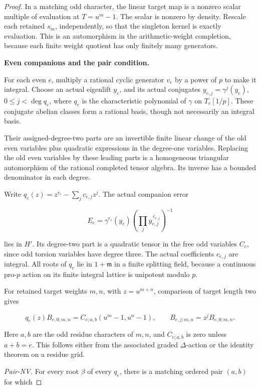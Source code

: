 \documentclass[11pt,a4paper]{article}
\theoremstyle{definition}
\begin{document}
\begin{proof}
In a matching odd character, the linear target map is a nonzero scalar multiple of evaluation at \(T=u^m-1\). The scalar is nonzero by density. Rescale each retained \(s_m\), independently, so that the singleton kernel is exactly evaluation. This is an automorphism in the arithmetic-weight completion, because each finite weight quotient has only finitely many generators.

\par\medskip\noindent\textbf{Even companions and the pair condition.}

For each even \(e\), multiply a rational cyclic generator \(v_e\) by a power of \(p\) to make it integral. Choose an actual eigenlift \(y_e\), and its actual conjugates \(y_{e,j}=\gamma^j(y_e)\), \(0\le j<\deg q_e\), where \(q_e\) is the characteristic polynomial of \(\gamma\) on \(T_e[1/p]\). These conjugate abelian classes form a rational basis, though not necessarily an integral basis.

Their assigned-degree-two parts are an invertible finite linear change of the old even variables plus quadratic expressions in the degree-one variables. Replacing the old even variables by these leading parts is a homogeneous triangular automorphism of the rational completed tensor algebra. Its inverse has a bounded denominator in each degree.

Write \(q_e(z)=z^{r_e}-\sum_j c_{e,j}z^j\). The actual companion error

\[
E_e=\gamma^{r_e}(y_e)
       \left(\prod_j y_{e,j}^{\,c_{e,j}}\right)^{-1}
\]

lies in \(H'\). Its degree-two part is a quadratic tensor in the free odd variables \(C_e\), since odd torsion variables have degree three. The actual coefficients \(c_{e,j}\) are integral. All roots of \(q_e\) lie in \(1+\mathfrak m\) in a finite splitting field, because a continuous pro-\(p\) action on its finite integral lattice is unipotent modulo \(p\).

For retained target weights \(m,n\), with \(z=u^{m+n}\), comparison of target length two gives

\[
q_e(z)B_{e,0;m,n}
  =C_{e;a,b}(u^m-1,u^n-1),\qquad B_{e,j;m,n}=z^jB_{e,0;m,n}.
\]

Here \(a,b\) are the odd residue characters of \(m,n\), and \(C_{e;a,b}\) is zero unless \(a+b=e\). This follows either from the associated graded \(\Delta\)-action or the identity theorem on a residue grid.

\emph{Pair-NV.} For every root \(\beta\) of every \(q_e\), there is a matching ordered pair \((a,b)\) for which


\end{proof}
\end{document}
